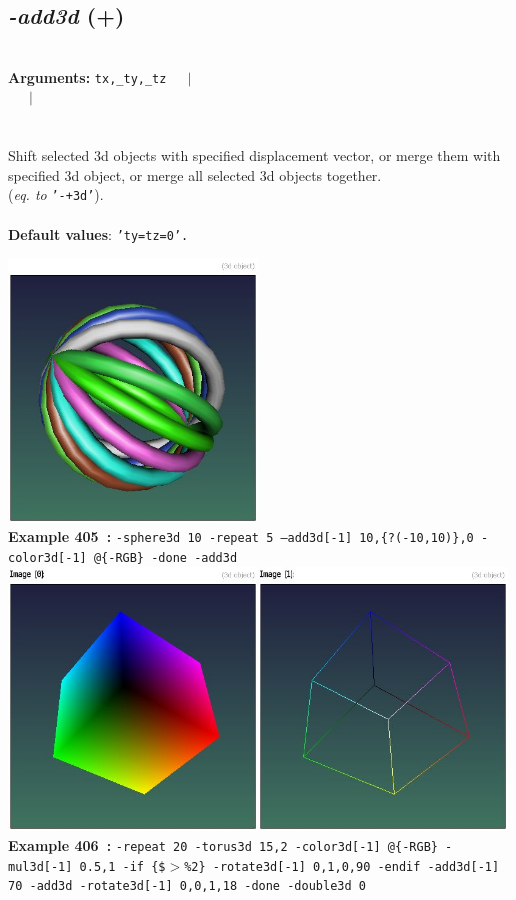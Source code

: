 \documentclass[a4paper,11pt,twoside]{book}
\begin{document}
\subsection{\emph{-add3d} (+)}\vspace*{-0.5em}
~\\\textbf{Arguments: } 
{\small \texttt{tx,\_ty,\_tz}}~~~$|$\\
\hspace*{2.2cm}{\small \texttt{[object3d]}}~~~$|$\\
\\~\\
Shift selected 3d objects with specified displacement vector, or merge them with specified
3d object, or merge all selected 3d objects together.
~\\(\emph{eq. to} {\small \texttt{'-+3d'}}).
~\\~\\\textbf{Default values}: {\small \texttt{'ty=tz=0'.}}
\begin{center}\includegraphics[keepaspectratio=true,height=7cm,width=\textwidth]{img/gmic_def405.jpg}\\
{\footnotesize \textbf{Example 405~:} \texttt{-sphere3d 10 -repeat 5 --add3d[-1] 10,\{?(-10,10)\},0 -color3d[-1] @\{-RGB\} -done -add3d}}
\\\includegraphics[keepaspectratio=true,height=7cm,width=\textwidth]{img/gmic_def406.jpg}\\
{\footnotesize \textbf{Example 406~:} \texttt{-repeat 20 -torus3d 15,2 -color3d[-1] @\{-RGB\} -mul3d[-1] 0.5,1 -if \{\$$>$\%2\} -rotate3d[-1] 0,1,0,90 -endif -add3d[-1] 70 -add3d -rotate3d[-1] 0,0,1,18 -done -double3d 0}}
\end{center}
\end{document}
